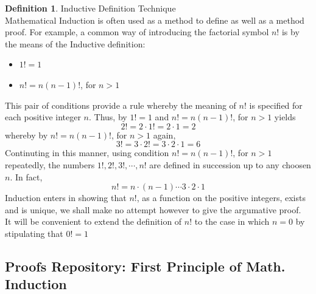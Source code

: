 \documentclass{book}
\theoremstyle{definition}
\newtheorem{definition}{Definition}[section]
\theoremstyle{remark}
\newcommand{\m}{\cdot}
\begin{document}
\begin{definition}
Inductive Definition Technique \\

Mathematical Induction is often used as a method to define as well as a method proof. For example, a common way of introducing the factorial symbol $n!$ is by the means of the Inductive definition: 
    \begin{itemize}
        \item $1! = 1$
        \item $n! = n(n-1)!$, for $n > 1$
    \end{itemize}
This pair of conditions provide a rule whereby the meaning of $n!$ is specified for each positive integer $n$. Thus, by $1! = 1$ and $n! = n(n-1)!$, for $n > 1$ yields
    \begin{equation*}
        2! = 2 \m 1 ! = 2 \m 1 = 2
    \end{equation*}
whereby by $n! = n(n-1)!$, for $n > 1$ again, 
    \begin{equation*}
        3! = 3 \m 2 ! = 3 \m 2 \m 1 = 6
    \end{equation*}
Continuting in this manner, using condition $n! = n(n-1)!$, for $n > 1$ repeatedly, the numbers $1!, 2!, 3!,\cdots, n!$ are defined in succession up to any choosen $n$. In fact, 
    \begin{equation*}
        n! = n \m (n-1) \cdots 3 \m 2 \m 1
    \end{equation*}
Induction enters in showing that $n!$, as a function on the positive integers, exists and is unique, we shall make no attempt however to give the argumative proof. \\

It will be convenient to extend the definition of $n!$ to the case in which $n=0$ by stipulating that $0! = 1$
\end{definition}






\newpage
\subsection{Proofs Repository: First Principle of Math. Induction}
\end{document}
